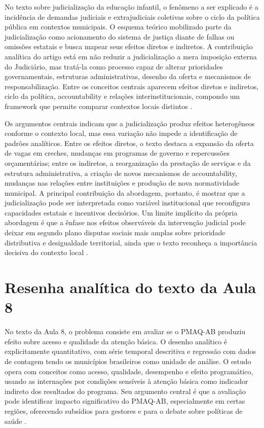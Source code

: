 \documentclass[12pt,a4paper]{article}
\begin{document}
No texto sobre judicialização da educação infantil, o fenômeno a ser explicado é a incidência de demandas judiciais e extrajudiciais coletivas sobre o ciclo da política pública em contextos municipais. O esquema teórico mobilizado parte da judicialização como acionamento do sistema de justiça diante de falhas ou omissões estatais e busca mapear seus efeitos diretos e indiretos. A contribuição analítica do artigo está em não reduzir a judicialização a mera imposição externa do Judiciário, mas tratá-la como processo capaz de alterar prioridades governamentais, estruturas administrativas, desenho da oferta e mecanismos de responsabilização. Entre os conceitos centrais aparecem efeitos diretos e indiretos, ciclo da política, accountability e relações interinstitucionais, compondo um framework que permite comparar contextos locais distintos \parencite{rodrigues2022_efeitos_judicializacao}.

Os argumentos centrais indicam que a judicialização produz efeitos heterogêneos conforme o contexto local, mas essa variação não impede a identificação de padrões analíticos. Entre os efeitos diretos, o texto destaca a expansão da oferta de vagas em creches, mudanças em programas de governo e repercussões orçamentárias; entre os indiretos, a reorganização da prestação de serviços e da estrutura administrativa, a criação de novos mecanismos de accountability, mudanças nas relações entre instituições e produção de nova normatividade municipal. A principal contribuição da abordagem, portanto, é mostrar que a judicialização pode ser interpretada como variável institucional que reconfigura capacidades estatais e incentivos decisórios. Um limite implícito da própria abordagem é que a ênfase nos efeitos observáveis da intervenção judicial pode deixar em segundo plano disputas sociais mais amplas sobre prioridade distributiva e desigualdade territorial, ainda que o texto reconheça a importância decisiva do contexto local \parencite{rodrigues2022_efeitos_judicializacao}.



\section{Resenha analítica do texto da Aula 8}
\label{sec:org4cf852c}

No texto da Aula 8, o problema consiste em avaliar se o PMAQ-AB produziu efeito sobre acesso e qualidade da atenção básica. O desenho analítico é explicitamente quantitativo, com série temporal descritiva e regressão com dados de contagem tendo os municípios brasileiros como unidade de análise. O estudo opera com conceitos como acesso, qualidade, desempenho e efeito programático, usando as internações por condições sensíveis à atenção básica como indicador indireto dos resultados do programa. Seu argumento central é que a avaliação pode identificar impacto significativo do PMAQ-AB, especialmente em certas regiões, oferecendo subsídios para gestores e para o debate sobre políticas de saúde \parencite{soares2020_uma_avaliacao}.
\end{document}
